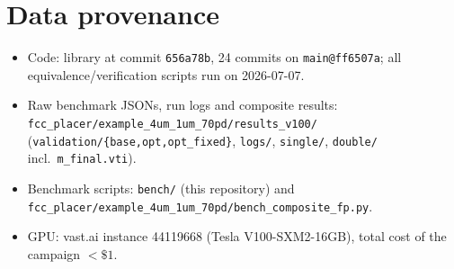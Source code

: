 \documentclass[11pt,a4paper]{article}
\begin{document}
\appendix
\section{Data provenance}
\begin{itemize}\small
\item Code: library at commit \texttt{656a78b}, 24 commits on
      \texttt{main@ff6507a}; all equivalence/verification scripts run on
      2026-07-07.
\item Raw benchmark JSONs, run logs and composite results:
      \texttt{fcc\_placer/example\_4um\_1um\_70pd/results\_v100/}
      (\texttt{validation/\{base,opt,opt\_fixed\}}, \texttt{logs/},
      \texttt{single/}, \texttt{double/} incl.\ \texttt{m\_final.vti}).
\item Benchmark scripts: \texttt{bench/} (this repository) and
      \texttt{fcc\_placer/example\_4um\_1um\_70pd/bench\_composite\_fp.py}.
\item GPU: vast.ai instance 44119668 (Tesla V100-SXM2-16GB), total cost of the
      campaign $<\$1$.
\end{itemize}
\end{document}

